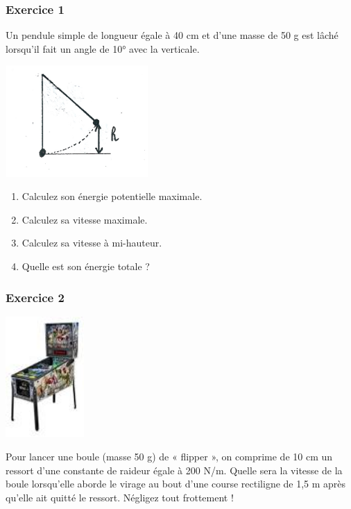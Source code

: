 \begin{multicols}{2}
\subsubsection*{Exercice 1}
Un pendule simple de longueur égale à 40 cm et d’une masse de 50 g est lâché lorsqu’il fait un angle de 10° avec la
verticale. 
\begin{center}
\begin{minipage}{5.992cm}
 \includegraphics[width=5.457cm,height=4.239cm]{COURS2EnergieOHEXERCRESOL-img/COURS2EnergieOHEXERCRESOL-img002.png} 
\end{minipage}
\end{center}
\begin{enumerate}
\item Calculez son énergie potentielle maximale.
\item Calculez sa vitesse maximale.
\item Calculez sa vitesse à mi-hauteur. 
\item Quelle est son énergie totale ? 
\end{enumerate}

\subsubsection*[Exercice 2]{Exercice 2}
\begin{center}
\begin{minipage}{3.81cm}
 \includegraphics[width=3cm]{COURS2EnergieOHEXERCRESOL-img/COURS2EnergieOHEXERCRESOL-img003.png} 
\end{minipage}
\end{center}
Pour lancer une boule (masse 50 g) de « flipper », on comprime de 10 cm un ressort d’une constante de  raideur égale à
200 N/m. Quelle sera la vitesse de la boule lorsqu’elle aborde le virage au bout d’une course rectiligne de 1,5 m après
qu’elle ait quitté le ressort. Négligez tout frottement !


\end{multicols}
